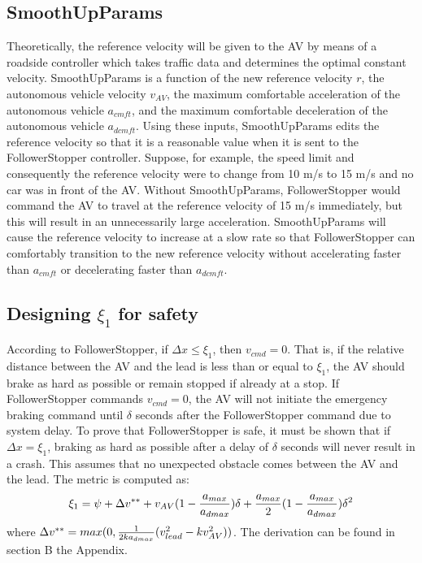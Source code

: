 \documentclass[conference]{IEEEtran}
\begin{document}
\subsection{SmoothUpParams}
Theoretically, the reference velocity will be given to the AV by means of a roadside controller which takes traffic data and determines the optimal constant velocity. SmoothUpParams is a function of the new reference velocity $r$, the autonomous vehicle velocity $v_{AV}$, the maximum comfortable acceleration of the autonomous vehicle $a_{cmft}$, and the maximum comfortable deceleration of the autonomous vehicle $a_{dcmft}$. Using these inputs, SmoothUpParams edits the reference velocity so that it is a reasonable value when it is sent to the FollowerStopper controller. Suppose, for example, the speed limit and consequently the reference velocity were to change from 10 m/s to 15 m/s and no car was in front of the AV. Without SmoothUpParams, FollowerStopper would command the AV to travel at the reference velocity of 15 m/s immediately, but this will result in an unnecessarily large acceleration. SmoothUpParams will cause the reference velocity to increase at a slow rate so that FollowerStopper can comfortably transition to the new reference velocity without accelerating faster than $a_{cmft}$ or decelerating faster than $a_{dcmft}$.

\subsection{Designing $\xi_1$ for safety}
According to FollowerStopper, if $\Delta x \leq \xi_1$, then $v_{cmd}=0$. That is, if the relative distance between the AV and the lead is less than or equal to $\xi_1$, the AV should brake as hard as possible or remain stopped if already at a stop. If FollowerStopper commands $v_{cmd}=0$, the AV will not initiate the emergency braking command until $\delta$ seconds after the FollowerStopper command due to system delay. To prove that FollowerStopper is safe, it must be shown that if $\Delta x = \xi_1$, braking as hard as possible after a delay of $\delta$ seconds will never result in a crash. This assumes that no unexpected obstacle comes between the AV and the lead. The metric is computed as:
\begin{dmath}
\xi_1 = \psi +\Delta v^{**}+v_{AV}(1-{a_{max}\over a_{dmax}})\delta+{a_{max}\over 2}(1-{a_{max}\over a_{dmax}})\delta^2
\end{dmath}
where $\Delta v^{**} = max(0,{1\over 2ka_{dmax}}(v_{lead}^2-kv_{AV}^2))$. The derivation can be found in section B the Appendix.
\end{document}
